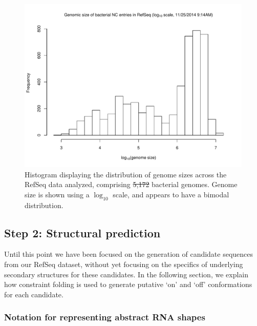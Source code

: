 \documentclass[11pt, oneside]{Thesis} %
\providecommand{\DIFadd}[1]{{\protect\color{blue}\uwave{#1}}} %
\providecommand{\DIFdel}[1]{{\protect\color{red}\sout{#1}}}                      %
\providecommand{\DIFaddFL}[1]{\DIFadd{#1}} %
\providecommand{\DIFdelFL}[1]{\DIFdel{#1}} %
\providecommand{\DIFaddbeginFL}{} %
\providecommand{\DIFaddendFL}{} %
\providecommand{\DIFdelbeginFL}{} %
\providecommand{\DIFdelendFL}{} %
\begin{document}
\begin{figure}[!ht]
\centering
\includegraphics[width=.9\textwidth]{Figures/Ribofinder/refseqGenomeSizes.pdf}
\caption[Histogram displaying the distribution of genome sizes across RefSeq]{Histogram displaying the distribution of genome sizes across the RefSeq
data analyzed, comprising \DIFdelbeginFL \DIFdelFL{5,172 }\DIFdelendFL \DIFaddbeginFL \DIFaddFL{$5,172$ }\DIFaddendFL bacterial genomes. Genome size is shown using a
$\log_{10}$ scale, and appears to have a bimodal distribution.}
\label{fig:rfinder:genomeSizes}
\end{figure}

\subsection{Step 2: Structural prediction}
\label{subsec:rfinder:strpred}

Until this point we have been focused on the generation of candidate sequences
from our RefSeq dataset, without yet focusing on the specifics of underlying
secondary structures for these candidates. In the following section, we explain
how constraint folding is used to generate putative `on' and `off' conformations
for each candidate.

\subsubsection{Notation for representing abstract RNA shapes}
\label{subsubsec:rfinder:shapes}
\end{document}
